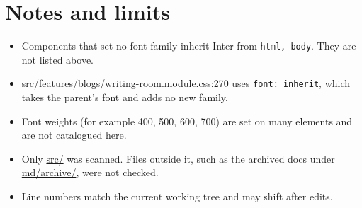 \documentclass[11pt,a4paper]{article}
\DeclareRobustCommand{\file}[1]{{\ttfamily\small\url{#1}}}
\begin{document}
\section{Notes and limits}

\begin{itemize}
  \item Components that set no font-family inherit Inter from \texttt{html, body}. They are not listed above.
  \item \file{src/features/blogs/writing-room.module.css:270} uses \texttt{font: inherit}, which takes the parent's font and adds no new family.
  \item Font weights (for example 400, 500, 600, 700) are set on many elements and are not catalogued here.
  \item Only \file{src/} was scanned. Files outside it, such as the archived docs under \file{md/archive/}, were not checked.
  \item Line numbers match the current working tree and may shift after edits.
\end{itemize}
\end{document}
